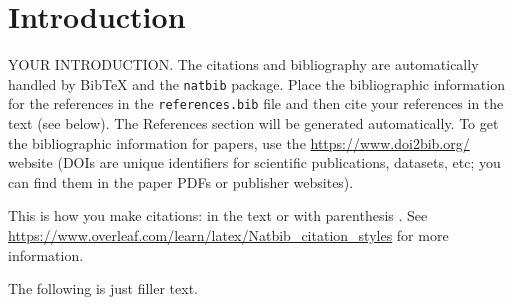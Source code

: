 \chapter{Introduction}

YOUR INTRODUCTION. The citations and bibliography are automatically handled by
BibTeX and the \texttt{natbib} package. Place the bibliographic information for
the references in the \texttt{references.bib} file and then cite your
references in the text (see below). The References section will be generated
automatically. To get the bibliographic information for papers, use the
\url{https://www.doi2bib.org/} website (DOIs are unique identifiers for
scientific publications, datasets, etc; you can find them in the paper PDFs or
publisher websites).

This is how you make citations: in the text \cite{Parker1973} or with
parenthesis \citep{Parker1973}. See
\url{https://www.overleaf.com/learn/latex/Natbib_citation_styles} for more
information.

The following is just filler text.

\lipsum[1-10]
